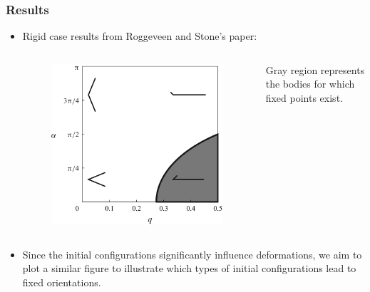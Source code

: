 \documentclass{beamer}
\begin{document}
\begin{frame}
	\frametitle{Results}
	\begin{overlayarea}{\textwidth}{\textheight}
	\begin{itemize}
		\item Rigid case results from Roggeveen and Stone’s paper:
		\begin{columns}
			\begin{column}{0.5\textwidth}
			\begin{figure}[htb]
				\begin{center}
					\includegraphics[width=1\textwidth]{plots/stone.png}
				\end{center}
			\end{figure}
			\end{column}
			\begin{column}{0.5\textwidth}
				Gray region represents the bodies for which fixed points exist.
			\end{column}
		\end{columns}
		\item Since the initial configurations significantly influence deformations, we aim to plot a similar figure to illustrate which types of initial configurations lead to fixed orientations.
	\end{itemize}
	\end{overlayarea}
\end{frame}
\end{document}

